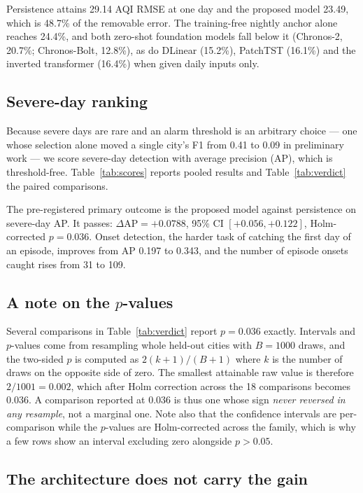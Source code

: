 \documentclass[conference]{IEEEtran}
\begin{document}
Persistence attains 29.14 AQI RMSE at one day and the proposed model 23.49, which is
48.7\% of the removable error. The training-free nightly anchor alone reaches 24.4\%,
and both zero-shot foundation models fall below it (Chronos-2, 20.7\%; Chronos-Bolt,
12.8\%), as do DLinear (15.2\%), PatchTST (16.1\%) and the inverted transformer (16.4\%)
when given daily inputs only.

\subsection{Severe-day ranking}

Because severe days are rare and an alarm threshold is an arbitrary choice --- one whose
selection alone moved a single city's F1 from 0.41 to 0.09 in preliminary work --- we
score severe-day detection with average precision (AP), which is threshold-free.
Table~\ref{tab:scores} reports pooled results and Table~\ref{tab:verdict} the paired
comparisons.




The pre-registered primary outcome is the proposed model against persistence on
severe-day AP. It passes: $\Delta\mathrm{AP} = +0.0788$, 95\% CI $[+0.056, +0.122]$,
Holm-corrected $p = 0.036$. Onset detection, the harder task of catching the first day of
an episode, improves from AP 0.197 to 0.343, and the number of episode onsets caught rises
from 31 to 109.

\subsection{A note on the $p$-values}
\label{sec:pvalues}

Several comparisons in Table~\ref{tab:verdict} report $p = 0.036$ exactly. Intervals and
$p$-values come from resampling whole held-out cities with $B = 1000$ draws, and the
two-sided $p$ is computed as $2(k+1)/(B+1)$ where $k$ is the number of draws on the
opposite side of zero. The smallest attainable raw value is therefore
$2/1001 = 0.002$, which after Holm correction across the 18 comparisons becomes 0.036.
A comparison reported at 0.036 is thus one whose sign \emph{never reversed in any
resample}, not a marginal one. Note also that the confidence intervals are
per-comparison while the $p$-values are Holm-corrected across the family, which is why a
few rows show an interval excluding zero alongside $p > 0.05$.

\subsection{The architecture does not carry the gain}
\end{document}
